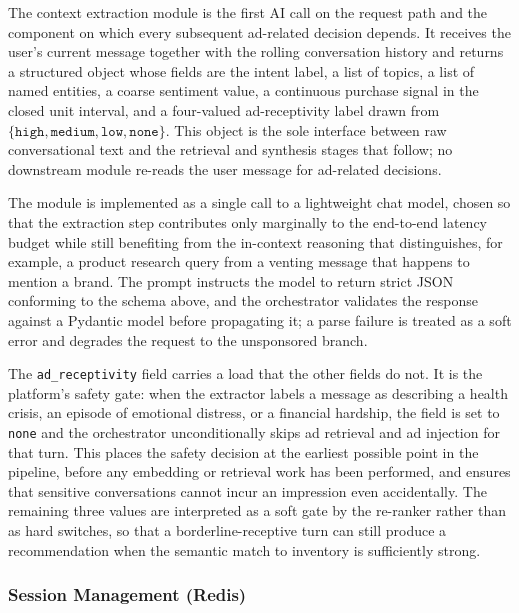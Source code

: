 The context extraction module is the first AI call on the request
path and the component on which every subsequent ad-related decision
depends. It receives the user's current message together with the
rolling conversation history and returns a structured object whose
fields are the intent label, a list of topics, a list of named
entities, a coarse sentiment value, a continuous purchase signal in
the closed unit interval, and a four-valued ad-receptivity label
drawn from \(\{\texttt{high}, \texttt{medium}, \texttt{low}, \texttt{none}\}\).
This object is the sole interface between raw conversational text and
the retrieval and synthesis stages that follow; no downstream module
re-reads the user message for ad-related decisions.

The module is implemented as a single call to a lightweight chat
model, chosen so that the extraction step contributes only marginally
to the end-to-end latency budget while still benefiting from the
in-context reasoning that distinguishes, for example, a product
research query from a venting message that happens to mention a brand.
The prompt instructs the model to return strict JSON conforming to the
schema above, and the orchestrator validates the response against a
Pydantic model before propagating it; a parse failure is treated as a
soft error and degrades the request to the unsponsored branch.

The \texttt{ad\_receptivity} field carries a load that the other
fields do not. It is the platform's safety gate: when the extractor
labels a message as describing a health crisis, an episode of
emotional distress, or a financial hardship, the field is set to
\texttt{none} and the orchestrator unconditionally skips ad
retrieval and ad injection for that turn. This places the safety
decision at the earliest possible point in the pipeline, before any
embedding or retrieval work has been performed, and ensures that
sensitive conversations cannot incur an impression even
accidentally. The remaining three values are interpreted as a soft
gate by the re-ranker rather than as hard switches, so that a
borderline-receptive turn can still produce a recommendation when the
semantic match to inventory is sufficiently strong.

\subsubsection{Session Management (Redis)}
\label{subsubsec:session-management}

